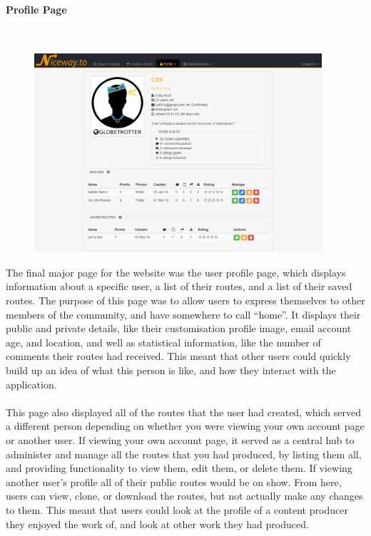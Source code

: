 \newpage 
\paragraph{Profile Page}\ \\

\begin{figure}[!ht]
	\vspace{-5mm}
	\begin{center}
		\includegraphics[width=0.95\textwidth]{images/design/profile.png}
	\end{center}
	\vspace{-5mm}
\end{figure}
\noindent 
The final major page for the website was the user profile page, which displays information about a specific user, a list of their routes, and a list of their saved routes. The purpose of this page was to allow users to express themselves to other members of the community, and have somewhere to call ``home''. It displays their public and private details, like their customisation profile image, email account age, and location, and well as statistical information, like the number of comments their routes had received. This meant that other users could quickly build up an idea of what this person is like, and how they interact with the application.\ \\
\ \\
This page also displayed all of the routes that the user had created, which served a different person depending on whether you were viewing your own account page or another user. If viewing your own account page, it served as a central hub to administer and manage all the routes that you had produced, by listing them all, and providing functionality to view them, edit them, or delete them. If viewing another user's profile all of their public routes would be on show. From here, users can view, clone, or download the routes, but not actually make any changes to them. This meant that users could look at the profile of a content producer they enjoyed the work of, and look at other work they had produced. 



